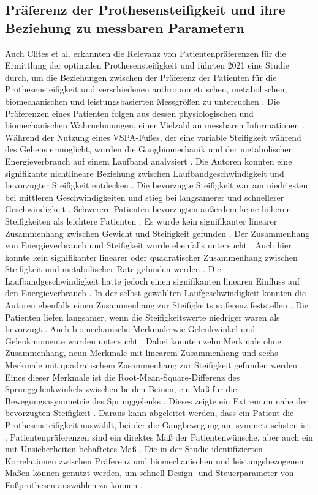 \subsection{Präferenz der Prothesensteifigkeit und ihre Beziehung zu messbaren Parametern}
Auch Clites et al. erkannten die Relevanz von Patientenpräferenzen für die Ermittlung der optimalen Prothesensteifigkeit und führten 2021 eine Studie durch, um die Beziehungen zwischen der Präferenz der Patienten für die Prothesensteifigkeit und verschiedenen anthropometrischen, metabolischen, biomechanischen und leistungsbasierten Messgrößen zu untersuchen \cite{Clites.2021}. Die Präferenzen eines Patienten folgen aus dessen physiologischen und biomechanischen Wahrnehmungen, einer Vielzahl an messbaren Informationen \cite{Clites.2021}.
Während der Nutzung eines VSPA-Fußes, der eine variable Steifigkeit während des Gehens ermöglicht, wurden die Gangbiomechanik und der metabolischer Energieverbrauch auf einem Laufband analysiert \cite{Clites.2021}.
Die Autoren konnten eine signifikante nichtlineare Beziehung zwischen Laufbandgeschwindigkeit und bevorzugter Steifigkeit entdecken \cite{Clites.2021}. Die bevorzugte Steifigkeit war am niedrigsten bei mittleren Geschwindigkeiten und stieg bei langsamerer und schnellerer Geschwindigkeit \cite{Clites.2021}.
Schwerere Patienten bevorzugten außerdem keine höheren Steifigkeiten als leichtere Patienten \cite{Clites.2021}.
Es wurde kein signifikanter linearer Zusammenhang zwischen Gewicht und Steifigkeit gefunden \cite{Clites.2021}.
Der Zusammenhang von Energieverbrauch und Steifigkeit wurde ebenfalls untersucht \cite{Clites.2021}. Auch hier konnte kein signifikanter linearer oder quadratischer Zusammenhang zwischen Steifigkeit und metabolischer Rate gefunden werden \cite{Clites.2021}. Die Laufbandgeschwindigkeit hatte jedoch einen signifikanten linearen Einfluss auf den Energieverbrauch \cite{Clites.2021}.
In der selbst gewählten Laufgeschwindigkeit konnten die Autoren ebenfalls einen Zusammenhang zur Steifigkeitspräferenz feststellen \cite{Clites.2021}. Die Patienten liefen langsamer, wenn die Steifigkeitswerte niedriger waren als bevorzugt \cite{Clites.2021}.
Auch biomechanische Merkmale wie Gelenkwinkel und Gelenkmomente wurden untersucht \cite{Clites.2021}. Dabei konnten zehn Merkmale ohne Zusammenhang, neun Merkmale mit linearem Zusammenhang und sechs Merkmale mit quadratischem Zusammenhang zur Steifigkeit gefunden werden \cite{Clites.2021}. Eines dieser Merkmale ist die Root-Mean-Square-Differenz des Sprunggelenkwinkels zwischen beiden Beinen, ein Maß für die Bewegungsasymmetrie des Sprunggelenks \cite{Clites.2021}. Dieses zeigte ein Extremum nahe der bevorzugten Steifigkeit \cite{Clites.2021}.
Daraus kann abgeleitet werden, dass ein Patient die Prothesensteifigkeit auswählt, bei der die Gangbewegung am symmetrischsten ist \cite{Clites.2021}.
Patientenpräferenzen sind ein direktes Maß der Patientenwünsche, aber auch ein mit Unsicherheiten behaftetes Maß \cite{Clites.2021}. Die in der Studie identifizierten Korrelationen zwischen Präferenz und biomechanischen und leistungsbezogenen Maßen können genutzt werden, um schnell Design- und Steuerparameter von Fußprothesen auswählen zu können \cite{Clites.2021}.

